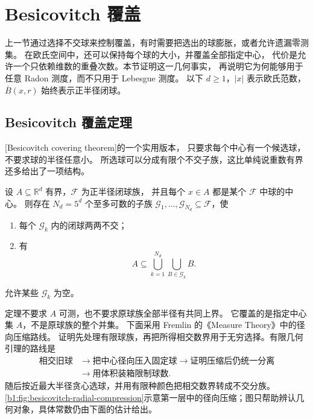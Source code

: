 \section{Besicovitch 覆盖}
\label{b1:sec:1302}


上一节通过选择不交球来控制覆盖，有时需要把选出的球膨胀，或者允许遗漏零测集。
在欧氏空间中，还可以保持每个球的大小，并覆盖全部指定中心，
代价是允许一个只依赖维数的重叠次数。本节证明这一几何事实，
再说明它为何能够用于任意 Radon 测度，而不只用于 Lebesgue 测度。
以下 \(d\geq1\)，\(|x|\) 表示欧氏范数，\(\overline B(x,r)\) 始终表示正半径闭球。

\subsection{Besicovitch 覆盖定理}
\label{b1:subsec:130201}

[Besicovitch covering theorem]的一个实用版本，
只要求每个中心有一个候选球，不要求球的半径任意小。
所选球可以分成有限个不交子族，这比单纯说重数有界还多给出了一项结构。

\begin{theorem}[Besicovitch 覆盖]\label{b1:thm:besicovitch-covering}
设 \(A\subseteq\mathbb R^d\) 有界，\(\mathcal F\) 为正半径闭球族，
并且每个 \(x\in A\) 都是某个 \(\mathcal F\) 中球的中心。
则存在 \(N_d=5^d\) 个至多可数的子族
\(\mathcal G_1,\ldots,\mathcal G_{N_d}\subseteq\mathcal F\)，使
\begin{enumerate}
\item\label{b1:item:besicovitch-disjoint}每个 \(\mathcal G_k\) 内的闭球两两不交；
\item\label{b1:item:besicovitch-cover}有
\[
 A\subseteq\bigcup_{k=1}^{N_d}\bigcup_{B\in\mathcal G_k}B.
\]
\end{enumerate}
允许某些 \(\mathcal G_k\) 为空。
\end{theorem}

定理不要求 \(A\) 可测，也不要求原球族全部半径有共同上界。
它覆盖的是指定中心集 \(A\)，不是原球族的整个并集。
下面采用 Fremlin 的《Measure Theory》\cite[472A--B]{Fremlin2016Measure}中的径向压缩路线。
证明先处理有限球族，再把所得相交数界用于无穷选择。有限几何引理的路线是
\[
 \begin{aligned}
 \text{相交旧球}
 &\longrightarrow\text{把中心径向压入固定球}
 \longrightarrow\text{证明压缩后仍统一分离}\\
 &\longrightarrow\text{用体积装箱限制球数}.
 \end{aligned}
\]
随后按近最大半径贪心选球，并用有限种颜色把相交数界转成不交分族。\cref{b1:fig:besicovitch-radial-compression}示意第一层中的径向压缩；图只帮助辨认几何对象，具体常数仍由下面的估计给出。

